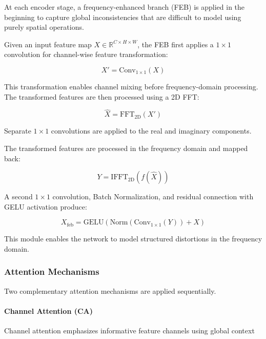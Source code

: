 At each encoder stage, a frequency-enhanced branch (FEB) is applied in the beginning to capture global inconsistencies that are difficult to model using purely spatial operations.

Given an input feature map $X \in \mathbb{R}^{C \times H \times W}$, the FEB first applies a $1 \times 1$ convolution for channel-wise feature transformation:

\begin{equation}
X' = \mathrm{Conv}_{1\times1}(X)
\end{equation}


This transformation enables channel mixing before frequency-domain processing. The transformed features are then processed using a 2D FFT:

\begin{equation}
\hat{X} = \mathrm{FFT}_{2\mathrm{D}}(X')
\end{equation}

Separate $1 \times 1$ convolutions are applied to the real and imaginary components.


The transformed features are processed in the frequency domain and mapped back:


\begin{equation}
    Y = \mathrm{IFFT}_{2\mathrm{D}}(f(\hat{X}))
\end{equation}

A second $1 \times 1$ convolution, Batch Normalization, and residual connection with GELU activation produce:

\begin{equation}
X_{\mathrm{feb}} =
\mathrm{GELU}\left(
\mathrm{Norm}(\mathrm{Conv}_{1\times1}(Y)) + X
\right)
\end{equation}

This module enables the network to model structured distortions in the frequency domain.

\subsubsection{Attention Mechanisms}

Two complementary attention mechanisms are applied sequentially.

\paragraph{Channel Attention (CA)}
Channel attention emphasizes informative feature channels using global context 

